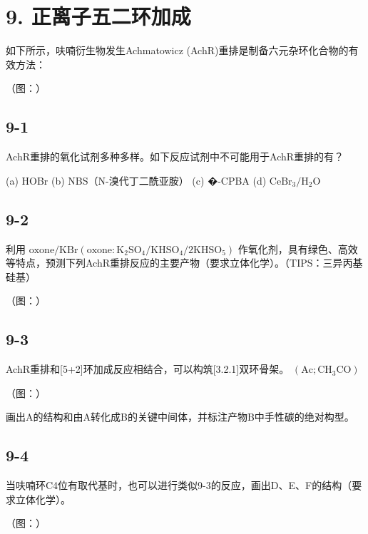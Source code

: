\section*{9. 正离子五二环加成}
如下所⽰，呋喃衍⽣物发⽣Achmatowicz (AchR)重排是制备六元杂环化合物的有效⽅法：

（图：）

\subsection*{9-1}
AchR重排的氧化试剂多种多样。如下反应试剂中不可能⽤于AchR重排的有？

(a) HOBr (b) NBS（N-溴代丁⼆酰亚胺） (c) �-CPBA (d) $\mathrm { C e B r _ { 3 } / H _ { 2 } O }$

\subsection*{9-2}
利⽤ $\mathrm { o x o n e / K B r ( o x o n e : K _ { 2 } S O _ { 4 } / K H S O _ { 4 } / 2 K H S O _ { 5 } ) }$ 作氧化剂，具有绿⾊、⾼效等特点，预测下列AchR重排反应的主要产物（要求⽴体化学）。（TIPS：三异丙基硅基）

（图：）

\subsection*{9-3}
AchR重排和[5+2]环加成反应相结合，可以构筑[3.2.1]双环⾻架。 $\mathrm { ( A c ; C H _ { 3 } C O ) }$

（图：）

画出A的结构和由A转化成B的关键中间体，并标注产物B中⼿性碳的绝对构型。

\subsection*{9-4}
当呋喃环C4位有取代基时，也可以进⾏类似9-3的反应，画出D、E、F的结构（要求⽴体化学）。

（图：）
